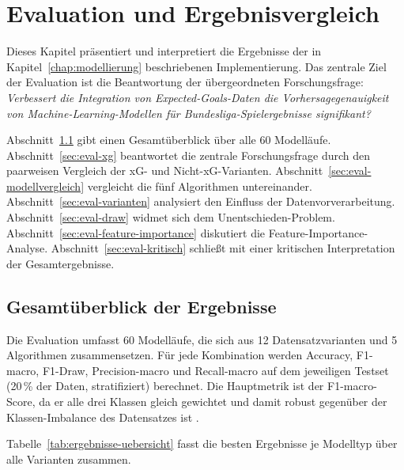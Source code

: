 
\chapter{Evaluation und Ergebnisvergleich}\label{chap:evaluation}

Dieses Kapitel präsentiert und interpretiert die Ergebnisse der in
Kapitel~\ref{chap:modellierung} beschriebenen Implementierung. Das zentrale
Ziel der Evaluation ist die Beantwortung der übergeordneten Forschungsfrage:
\emph{Verbessert die Integration von Expected-Goals-Daten die Vorhersagegenauigkeit
von Machine-Learning-Modellen für Bundesliga-Spielergebnisse signifikant?}

Abschnitt~\ref{sec:eval-uebersicht} gibt einen Gesamtüberblick über alle
60 Modelläufe. Abschnitt~\ref{sec:eval-xg} beantwortet die zentrale
Forschungsfrage durch den paarweisen Vergleich der xG- und Nicht-xG-Varianten.
Abschnitt~\ref{sec:eval-modellvergleich} vergleicht die fünf Algorithmen
untereinander. Abschnitt~\ref{sec:eval-varianten} analysiert den Einfluss
der Datenvorverarbeitung. Abschnitt~\ref{sec:eval-draw} widmet sich dem
Unentschieden-Problem. Abschnitt~\ref{sec:eval-feature-importance} diskutiert
die Feature-Importance-Analyse. Abschnitt~\ref{sec:eval-kritisch} schließt
mit einer kritischen Interpretation der Gesamtergebnisse.

\section{Gesamtüberblick der Ergebnisse}
\label{sec:eval-uebersicht}

Die Evaluation umfasst 60 Modelläufe, die sich aus 12 Datensatzvarianten
und 5 Algorithmen zusammensetzen. Für jede Kombination werden Accuracy,
F1-macro, F1-Draw, Precision-macro und Recall-macro auf dem jeweiligen
Testset (20\,\% der Daten, stratifiziert) berechnet. Die Hauptmetrik ist
der F1-macro-Score, da er alle drei Klassen gleich gewichtet und damit
robust gegenüber der Klassen-Imbalance des Datensatzes ist \cite{Powers2020}.

Tabelle~\ref{tab:ergebnisse-uebersicht} fasst die besten Ergebnisse je
Modelltyp über alle Varianten zusammen.

